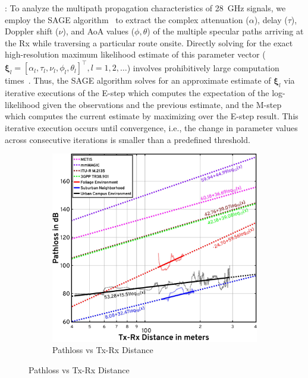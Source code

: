 \documentclass[10pt, twocolumn]{IEEEtran}
\begin{document}
{: To analyze the multipath propagation characteristics of \SI{28}{\giga\hertz} signals, we employ the SAGE algorithm~\cite{SAGE} to extract the complex attenuation ($\alpha$), delay ($\tau$), Doppler shift ($\nu$), and AoA values ($\phi,\theta$) of the multiple specular paths arriving at the Rx while traversing a particular route onsite. Directly solving for the exact high-resolution maximum likelihood estimate of this parameter vector ($\boldsymbol{\xi}_{l}{=}[\alpha_{l},\tau_{l},\nu_{l},\phi_{l},\theta_{l}]^{\intercal},l{=}1,2,{\dots}$) involves prohibitively large computation times~\cite{SAGE}. Thus, the SAGE algorithm solves for an approximate estimate of $\boldsymbol{\xi}_{l}$ via iterative executions of the E-step which computes the expectation of the log-likelihood given the observations and the previous estimate, and the M-step which computes the current estimate by maximizing over the E-step result. This iterative execution occurs until convergence, i.e., the change in parameter values across consecutive iterations is smaller than a predefined threshold.
\begin{figure} [t]
    \centering
    \begin{subfigure}{0.49\linewidth}
        \centering
        \includegraphics[width=1.0\linewidth]{figs/pathloss_vs_distance.pdf}
        \caption{Pathloss vs Tx-Rx Distance}
        \label{F7a}
    \end{subfigure}

\end{figure}}
\end{document}
